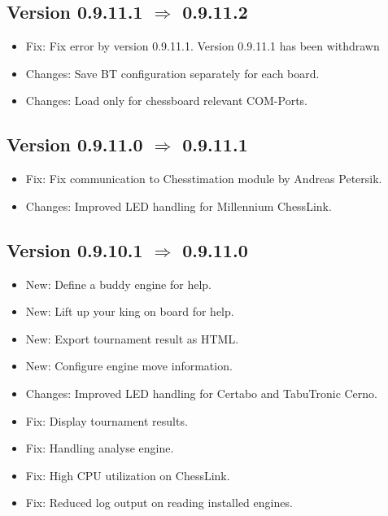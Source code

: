 \documentclass[11pt,a4paper]{article}
\begin{document}
\subsection*{Version 0.9.11.1 $\Rightarrow$  0.9.11.2}
\begin{itemize}	
	\item {\color{red}Fix}: Fix error by version 0.9.11.1. Version 0.9.11.1 has been withdrawn	
	\item {\color{teal}Changes}: Save BT configuration separately for each board.
    \item {\color{teal}Changes}: Load only for chessboard relevant COM-Ports.
\end{itemize}

\subsection*{Version 0.9.11.0 $\Rightarrow$ {\color{red}0.9.11.1}}
\begin{itemize}	
	\item {\color{red}Fix}: Fix communication to Chesstimation module by Andreas Petersik.	
    \item {\color{teal}Changes}: Improved LED handling for Millennium ChessLink.
\end{itemize}


\subsection*{Version 0.9.10.1 $\Rightarrow$  0.9.11.0}
\begin{itemize}
    \item {\color{blue}New}: Define a buddy engine for help.
	\item {\color{blue}New}: Lift up your king on board for help.
    \item {\color{blue}New}: Export tournament result as HTML.
    \item {\color{blue}New}: Configure engine move information.
	\item {\color{teal}Changes}: Improved LED handling for Certabo and TabuTronic Cerno.
	\item {\color{red}Fix}: Display tournament results.	
	\item {\color{red}Fix}: Handling analyse engine.
	\item {\color{red}Fix}: High CPU utilization on ChessLink.
	\item {\color{red}Fix}: Reduced log output on reading installed engines.
\end{itemize}
\end{document}
